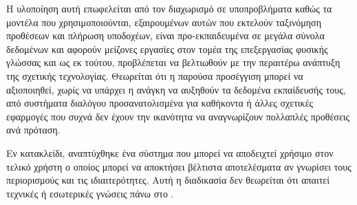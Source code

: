 Η υλοποίηση αυτή επωφελείται από τον διαχωρισμό σε υποπροβλήματα καθώς τα μοντέλα που χρησιμοποιούνται, εξαιρουμένων αυτών που εκτελούν ταξινόμηση προθέσεων και πλήρωση υποδοχέων,
είναι προ-εκπαιδευμένα σε μεγάλα σύνολα δεδομένων και αφορούν μείζονες εργασίες στον τομέα της επεξεργασίας φυσικής γλώσσας και ως εκ τούτου, προβλέπεται να βελτιωθούν με την περαιτέρω ανάπτυξη της σχετικής τεχνολογίας.
Θεωρείται ότι η παρούσα προσέγγιση μπορεί να αξιοποιηθεί, χωρίς να υπάρχει η ανάγκη να αυξηθούν τα δεδομένα εκπαίδευσής τους, από συστήματα διαλόγου προσανατολισμένα για καθήκοντα ή άλλες σχετικές εφαρμογές που συχνά δεν έχουν την ικανότητα να αναγνωρίζουν πολλαπλές προθέσεις ανά πρόταση.

Εν κατακλείδι, αναπτύχθηκε ένα σύστημα που μπορεί να αποδειχτεί χρήσιμο στον τελικό χρήστη ο οποίος μπορεί να αποκτήσει βέλτιστα αποτελέσματα αν γνωρίσει τους περιορισμούς και τις ιδιαιτερότητες.
Αυτή η διαδικασία δεν θεωρείται ότι απαιτεί τεχνικές ή εσωτερικές γνώσεις πάνω στο \projectname{}.

